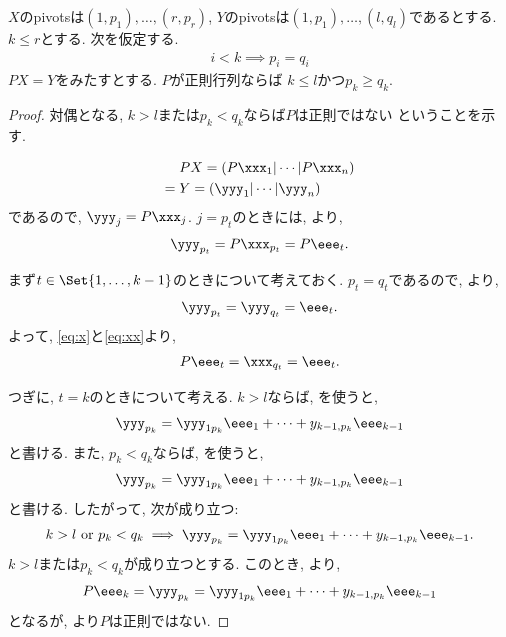 \begin{lemma}
  \label{lem:8}
  $X$のpivotsは$(1,p_1),\ldots,(r,p_r)$,
  $Y$のpivotsは$(1,p_1),\ldots,(l,q_l)$であるとする.
  $k\leq r$とする.
  次を仮定する.
  \begin{align*}
    i<k \implies p_i=q_i
  \end{align*}
  $PX=Y$をみたすとする.
  $P$が正則行列ならば
  $k\leq l$かつ$p_k\geq q_k$. 
\end{lemma}
\begin{proof}
  対偶となる,
  $k> l$または$p_k< q_k$ならば$P$は正則ではない
  ということを示す.
  
  \begin{align*}
    &PX=(P\xxx_1|\cdots|P\xxx_n)\\
    ={}&Y=(\yyy_1|\cdots|\yyy_n)
  \end{align*}
  であるので, $\yyy_j=P\xxx_j$.
  $j=p_t$のときには, より,
  \begin{align}
    \yyy_{p_t}=P\xxx_{p_t}=P\eee_t.
    \label{eq:x}
  \end{align}

  まず$t\in\Set{1,\ldots,k-1}$のときについて考えておく.
  $p_t=q_t$であるので,
  より,
  \begin{align}
    \yyy_{p_t}=\yyy_{q_t}=\eee_t.
    \label{eq:xx}
  \end{align}
  よって, \eqref{eq:x}と\eqref{eq:xx}より,
  \begin{align*}
    P\eee_t=\xxx_{q_t}=\eee_t.
  \end{align*}


  つぎに, $t=k$のときについて考える.
  $k>l$ならば, を使うと,
  \begin{align*}
    \yyy_{p_k}=\yyy_{1p_k}\eee_1+\cdots+y_{k-1,p_k}\eee_{k-1}
  \end{align*}
  と書ける.
  また, $p_k<q_k$ならば, を使うと,
  \begin{align*}
    \yyy_{p_k}=\yyy_{1p_k}\eee_1+\cdots+y_{k-1,p_k}\eee_{k-1}
  \end{align*}
  と書ける.
  したがって,
  次が成り立つ:
  \begin{align*}
    k>l \text{ or } p_k<q_k
    \implies
    \yyy_{p_k}=\yyy_{1p_k}\eee_1+\cdots+y_{k-1,p_k}\eee_{k-1}.
  \end{align*}
  $k>l$または$p_k<q_k$が成り立つとする.
  このとき, より,
  \begin{align*}
    P\eee_k
    =\yyy_{p_k}
    =\yyy_{1p_k}\eee_1+\cdots+y_{k-1,p_k}\eee_{k-1}
  \end{align*}
  となるが,
  より$P$は正則ではない.
\end{proof}


